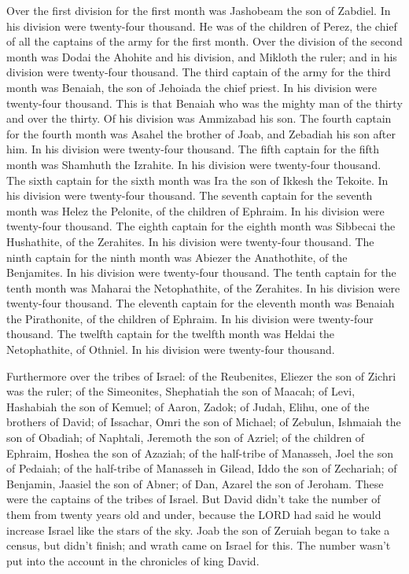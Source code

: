  Over the first division for the first month was Jashobeam
the son of Zabdiel. In his division were twenty-four thousand.
 He was of the children of Perez, the chief of all the
captains of the army for the first month.  Over the division
of the second month was Dodai the Ahohite and his division, and Mikloth
the ruler; and in his division were twenty-four thousand. 
The third captain of the army for the third month was Benaiah, the son
of Jehoiada the chief priest. In his division were twenty-four thousand.
 This is that Benaiah who was the mighty man of the thirty
and over the thirty. Of his division was Ammizabad his son. 
The fourth captain for the fourth month was Asahel the brother of Joab,
and Zebadiah his son after him. In his division were twenty-four
thousand.  The fifth captain for the fifth month was
Shamhuth the Izrahite. In his division were twenty-four thousand.
 The sixth captain for the sixth month was Ira the son of
Ikkesh the Tekoite. In his division were twenty-four thousand.
 The seventh captain for the seventh month was Helez the
Pelonite, of the children of Ephraim. In his division were twenty-four
thousand.  The eighth captain for the eighth month was
Sibbecai the Hushathite, of the Zerahites. In his division were
twenty-four thousand.  The ninth captain for the ninth
month was Abiezer the Anathothite, of the Benjamites. In his division
were twenty-four thousand.  The tenth captain for the tenth
month was Maharai the Netophathite, of the Zerahites. In his division
were twenty-four thousand.  The eleventh captain for the
eleventh month was Benaiah the Pirathonite, of the children of Ephraim.
In his division were twenty-four thousand.  The twelfth
captain for the twelfth month was Heldai the Netophathite, of Othniel.
In his division were twenty-four thousand.

 Furthermore over the tribes of Israel: of the Reubenites,
Eliezer the son of Zichri was the ruler; of the Simeonites, Shephatiah
the son of Maacah;  of Levi, Hashabiah the son of Kemuel;
of Aaron, Zadok;  of Judah, Elihu, one of the brothers of
David; of Issachar, Omri the son of Michael;  of Zebulun,
Ishmaiah the son of Obadiah; of Naphtali, Jeremoth the son of Azriel;
 of the children of Ephraim, Hoshea the son of Azaziah; of
the half-tribe of Manasseh, Joel the son of Pedaiah;  of
the half-tribe of Manasseh in Gilead, Iddo the son of Zechariah; of
Benjamin, Jaasiel the son of Abner;  of Dan, Azarel the son
of Jeroham. These were the captains of the tribes of Israel.
 But David didn't take the number of them from twenty years
old and under, because the LORD had said he would increase Israel like
the stars of the sky.  Joab the son of Zeruiah began to
take a census, but didn't finish; and wrath came on Israel for this. The
number wasn't put into the account in the chronicles of king David.

